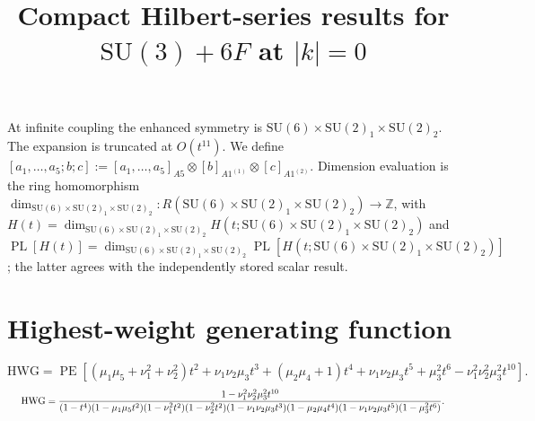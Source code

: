 \documentclass[10pt]{article}
\title{Compact Hilbert-series results for $\mathrm{SU(3)}+6F$ at $\lvert k\rvert=0$}
\date{}
\newcommand{\PE}{\operatorname{PE}}
\begin{document}
\maketitle
At infinite coupling the enhanced symmetry is $\mathrm{SU}(6)\times\mathrm{SU(2)_1}\times\mathrm{SU(2)_2}$.
The expansion is truncated at $O(t^{11})$.  We define
$[a_1,\ldots,a_{5};b;c]:=[a_1,\ldots,a_{5}]_{A5}\otimes[b]_{A1^{(1)}}\otimes[c]_{A1^{(2)}}$.
Dimension evaluation is the ring homomorphism
$\dim_{\mathrm{SU}(6)\times\mathrm{SU(2)_1}\times\mathrm{SU(2)_2}}:R(\mathrm{SU}(6)\times\mathrm{SU(2)_1}\times\mathrm{SU(2)_2})\to\mathbb{Z}$, with
$H(t)=\dim_{\mathrm{SU}(6)\times\mathrm{SU(2)_1}\times\mathrm{SU(2)_2}}H(t;\mathrm{SU}(6)\times\mathrm{SU(2)_1}\times\mathrm{SU(2)_2})$ and
$\operatorname{PL}[H(t)]=\dim_{\mathrm{SU}(6)\times\mathrm{SU(2)_1}\times\mathrm{SU(2)_2}}
\operatorname{PL}[H(t;\mathrm{SU}(6)\times\mathrm{SU(2)_1}\times\mathrm{SU(2)_2})]$;
the latter agrees with the independently stored scalar result.

\section{Highest-weight generating function}
\begin{equation}
\mathrm{HWG}=\PE\!\left[
(\mu_1\mu_5+\nu_1^2+\nu_2^2)t^2
+\nu_1\nu_2\mu_3t^3
+(\mu_2\mu_4+1)t^4
+\nu_1\nu_2\mu_3t^5
+\mu_3^2t^6
-\nu_1^2\nu_2^2\mu_3^2t^{10}
\right].
\end{equation}
\begin{equation}
\resizebox{0.98\linewidth}{!}{${\displaystyle
\mathrm{HWG}=\frac{1-\nu_1^2\nu_2^2\mu_3^2t^{10}}
{(1-t^4)(1-\mu_1\mu_5t^2)(1-\nu_1^2t^2)(1-\nu_2^2t^2)
 (1-\nu_1\nu_2\mu_3t^3)(1-\mu_2\mu_4t^4)
 (1-\nu_1\nu_2\mu_3t^5)(1-\mu_3^2t^6)}.}$}
\end{equation}
\end{document}
